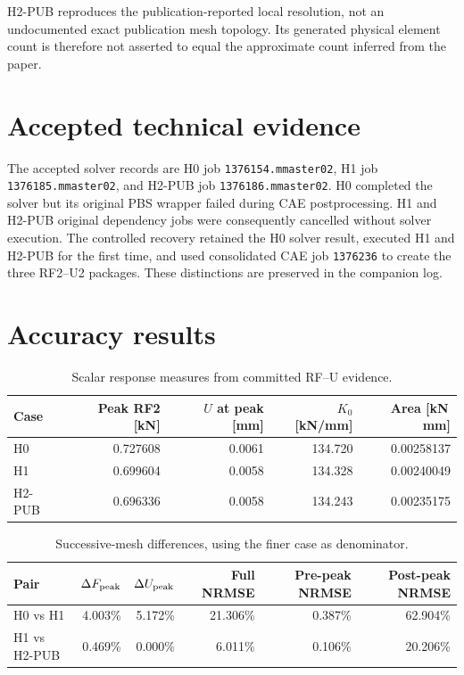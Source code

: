 \documentclass[11pt,a4paper]{article}
\begin{document}
H2-PUB reproduces the publication-reported local resolution, not an
undocumented exact publication mesh topology.  Its generated physical element
count is therefore not asserted to equal the approximate count inferred from
the paper.

\section{Accepted technical evidence}

The accepted solver records are H0 job \texttt{1376154.mmaster02}, H1 job
\texttt{1376185.mmaster02}, and H2-PUB job
\texttt{1376186.mmaster02}.  H0 completed the solver but its original PBS
wrapper failed during CAE postprocessing.  H1 and H2-PUB original dependency
jobs were consequently cancelled without solver execution.  The controlled
recovery retained the H0 solver result, executed H1 and H2-PUB for the first
time, and used consolidated CAE job \texttt{1376236} to create the three
RF2--U2 packages.  These distinctions are preserved in the companion log.

\section{Accuracy results}

\begin{table}[h]
\centering
\caption{Scalar response measures from committed RF--U evidence.}
\begin{tabular}{@{}lrrrr@{}}
\toprule
Case & Peak RF2 [kN] & \(U\) at peak [mm] & \(K_0\) [kN/mm] &
Area [kN\,mm] \\
\midrule
H0 & 0.727608 & 0.0061 & 134.720 & 0.00258137 \\
H1 & 0.699604 & 0.0058 & 134.328 & 0.00240049 \\
H2-PUB & 0.696336 & 0.0058 & 134.243 & 0.00235175 \\
\bottomrule
\end{tabular}
\end{table}

\begin{table}[h]
\centering
\caption{Successive-mesh differences, using the finer case as denominator.}
\begin{tabular}{@{}lrrrrr@{}}
\toprule
Pair & \(\Delta F_{\rm peak}\) & \(\Delta U_{\rm peak}\) &
Full NRMSE & Pre-peak NRMSE & Post-peak NRMSE \\
\midrule
H0 vs H1 & 4.003\% & 5.172\% & 21.306\% & 0.387\% & 62.904\% \\
H1 vs H2-PUB & 0.469\% & 0.000\% & 6.011\% & 0.106\% & 20.206\% \\
\bottomrule
\end{tabular}
\end{table}
\end{document}
